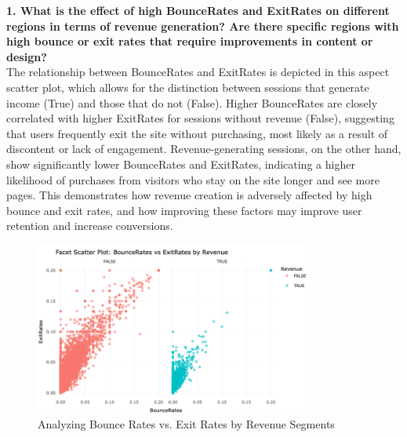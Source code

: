 \documentclass[12pt]{article}
\begin{document}
\textbf{1. What is the effect of high BounceRates and ExitRates on different regions in terms of revenue generation? Are there specific regions with high bounce or exit rates that require improvements in content or design?} \\[5pt] %

The relationship between BounceRates and ExitRates is depicted in this aspect scatter plot, which allows for the distinction between sessions that generate income (True) and those that do not (False). Higher BounceRates are closely correlated with higher ExitRates for sessions without revenue (False), suggesting that users frequently exit the site without purchasing, most likely as a result of discontent or lack of engagement. Revenue-generating sessions, on the other hand, show significantly lower BounceRates and ExitRates, indicating a higher likelihood of purchases from visitors who stay on the site longer and see more pages. This demonstrates how revenue creation is adversely affected by high bounce and exit rates, and how improving these factors may improve user retention and increase conversions.
\begin{figure}[h]
    \centering
    \includegraphics[width=0.82\textwidth]{Facet Scatter Plot- BounceRates vs ExitRates by Revenue.png}  
    \caption{Analyzing Bounce Rates vs. Exit Rates by Revenue Segments}
\end{figure}
\vspace{0.5cm}
\end{document}
